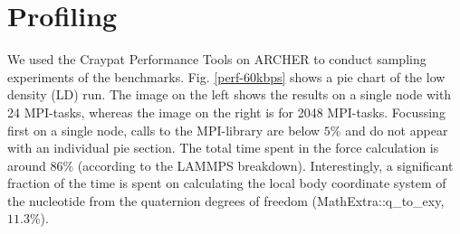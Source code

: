 \documentclass[12pt,onecolumn]{article}
\begin{document}
\section{Profiling}

We used the Craypat Performance Tools on ARCHER to conduct sampling experiments of the benchmarks. Fig. \ref{perf-60kbps} shows a pie chart
of the low density (LD) run. The image on the left shows the results on a single node with 24 MPI-tasks, whereas the image on the right 
is for 2048 MPI-tasks.
Focussing first on a single node, calls to the MPI-library are below $5\%$ and do not appear with an individual pie section. 
The total time spent in the force calculation is around $86\%$ (according to the LAMMPS breakdown).
Interestingly, a significant fraction of the time is spent on calculating the local body coordinate system of the nucleotide from the quaternion 
degrees of freedom (MathExtra::q\_to\_exy, $11.3\%$).
\end{document}
